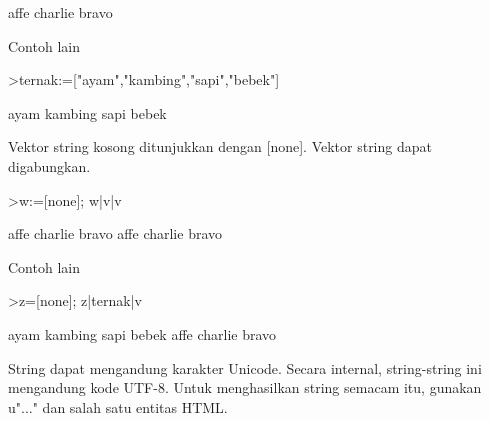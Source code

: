 \documentclass[a4paper,10pt]{article}
\begin{document}
\begin{eulernotebook}
\begin{euleroutput}
  affe
  charlie
  bravo
\end{euleroutput}
\begin{eulercomment}
Contoh lain
\end{eulercomment}
\begin{eulerprompt}
>ternak:=["ayam","kambing","sapi","bebek"]
\end{eulerprompt}
\begin{euleroutput}
  ayam
  kambing
  sapi
  bebek
\end{euleroutput}
\begin{eulercomment}
Vektor string kosong ditunjukkan dengan [none]. Vektor string dapat
digabungkan.
\end{eulercomment}
\begin{eulerprompt}
>w:=[none]; w|v|v
\end{eulerprompt}
\begin{euleroutput}
  affe
  charlie
  bravo
  affe
  charlie
  bravo
\end{euleroutput}
\begin{eulercomment}
Contoh lain
\end{eulercomment}
\begin{eulerprompt}
>z=[none]; z|ternak|v
\end{eulerprompt}
\begin{euleroutput}
  ayam
  kambing
  sapi
  bebek
  affe
  charlie
  bravo
\end{euleroutput}
\begin{eulercomment}
String dapat mengandung karakter Unicode. Secara internal,
string-string ini mengandung kode UTF-8. Untuk menghasilkan string
semacam itu, gunakan u"..." dan salah satu entitas HTML.


\end{eulercomment}
\end{eulernotebook}
\end{document}
